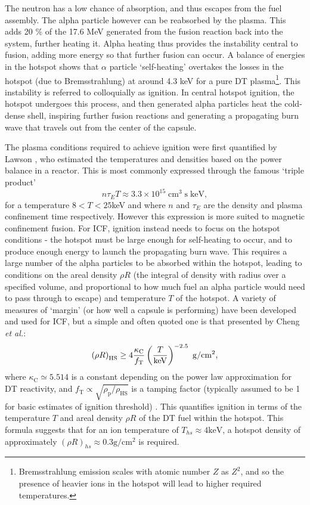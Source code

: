The neutron has a low chance of absorption, and thus escapes from the fuel assembly. The alpha particle however can be reabsorbed by the plasma. This adds 20 \% of the 17.6 MeV generated from the fusion reaction back into the system, further heating it. Alpha heating thus provides the instability central to fusion, adding more energy so that further fusion can occur. A balance of energies in the hotspot shows that $\alpha$ particle `self-heating' overtakes the losses in the hotspot (due to Bremsstrahlung) at around 4.3 keV for a pure DT plasma\footnote{Bremsstrahlung emission scales with atomic number $Z$ as $Z^2$, and so the presence of heavier ions in the hotspot will lead to higher required temperatures.}. This instability is referred to colloquially as ignition. In central hotspot ignition, the hotspot undergoes this process, and then generated alpha particles heat the cold-dense shell, inspiring further fusion reactions and generating a propagating burn wave that travels out from the center of the capsule.

The plasma conditions required to achieve ignition were first quantified by Lawson \cite{Lawson1957}, who estimated the temperatures and densities based on the power balance in a reactor. This is most commonly expressed through the famous `triple product' 
\begin{equation} n \tau_E T \approx 3.3 \times 10^{15} \; \unit{\centi\meter\cubed} \; \unit{\second}\; \text{keV}, \end{equation}
for a temperature $8 < T < 25 $keV and where $n$ and $\tau_E$ are the density and plasma confinement time respectively. However this expression is more suited to magnetic confinement fusion. For ICF, ignition instead needs to focus on the hotspot conditions - the hotspot must be large enough for self-heating to occur, and to produce enough energy to launch the propagating burn wave. This requires a large number of the alpha particles to be absorbed within the hotspot, leading to conditions on the areal density $\rho R$ (the integral of density with radius over a specified volume, and proportional to how much fuel an alpha particle would need to pass through to escape) and temperature $T$ of the hotspot. A variety of measures of `margin' (or how well a capsule is performing) have been developed and used for ICF, but a simple and often quoted one is that presented by Cheng \textit{et al.}:
\begin{equation} \left( \rho R \right)_\mathrm{HS} \geq 4 \frac{\kappa_\mathrm{C}}{f_\mathrm{T}} \left( \frac{T}{\mathrm{keV}} \right)^{-2.5} \text{ \si[per-mode=symbol]{\gram\per\centi\meter\squared}}, \label{ChengEqn} \end{equation}
where $\kappa_\mathrm{C} \simeq 5.514$ is a constant depending on the power law approximation for DT reactivity, and $f_\mathrm{T} \propto \sqrt{ \rho_\mathrm{p} / \rho_\mathrm{HS}}$ is a tamping factor (typically assumed to be 1 for basic estimates of ignition threshold) \cite{Cheng2014}. This quantifies ignition in terms of the temperature $T$ and areal density $\rho R$ of the DT fuel within the hotspot. This formula suggests that for an ion temperature of $T_{hs} \approx 4 \text{keV}$, a hotspot density of approximately $(\rho R)_{hs} \approx 0.3 \unit{\gram\per\centi\meter\squared}$ is required.

